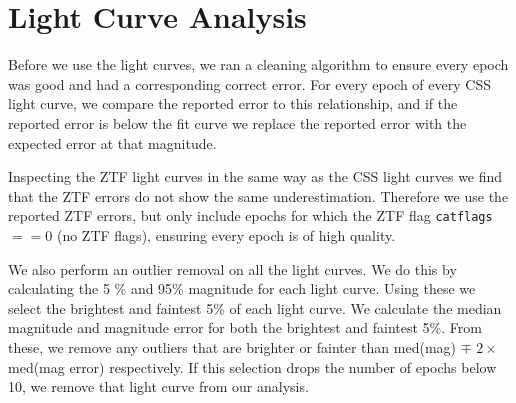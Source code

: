\documentclass[twocolumn, tighten, astrosymb]{aastex631}
\begin{document}
\section{Light Curve Analysis} \label{sec:lc_analysis}

Before we use the light curves, we ran a cleaning algorithm to ensure every epoch was good and had a corresponding correct error.
For every epoch of every CSS light curve, we compare the reported error to this relationship, and if the reported error is below the fit curve we replace the reported error with the expected error at that magnitude. 

Inspecting the ZTF light curves in the same way as the CSS light curves we find that the ZTF errors do not show the same underestimation. Therefore we use the reported ZTF errors, but only include epochs for which the ZTF flag \texttt{catflags} $ == 0$ (no ZTF flags), ensuring every epoch is of high quality.

We also perform an outlier removal on all the light curves. We do this by calculating the 5 \% and 95\% magnitude for each light curve. Using these we select the brightest and faintest 5\% of each light curve. We calculate the median magnitude and magnitude error for both the brightest and faintest 5\%. From these, we remove any outliers that are brighter or fainter than med(mag) $\mp$ $2\times$med(mag error) respectively. If this selection drops the number of epochs below 10, we remove that light curve from our analysis.
\end{document}

